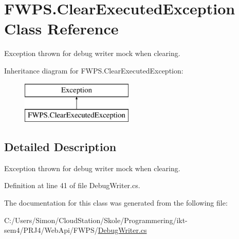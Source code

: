 \hypertarget{class_f_w_p_s_1_1_clear_executed_exception}{}\section{F\+W\+P\+S.\+Clear\+Executed\+Exception Class Reference}
\label{class_f_w_p_s_1_1_clear_executed_exception}


Exception thrown for debug writer mock when clearing.  


Inheritance diagram for F\+W\+P\+S.\+Clear\+Executed\+Exception\+:\begin{figure}[H]
\begin{center}
\leavevmode
\includegraphics[height=2.000000cm]{class_f_w_p_s_1_1_clear_executed_exception}
\end{center}
\end{figure}


\subsection{Detailed Description}
Exception thrown for debug writer mock when clearing. 

Definition at line 41 of file Debug\+Writer.\+cs.



The documentation for this class was generated from the following file\+:\begin{DoxyCompactItemize}
\item 
C\+:/\+Users/\+Simon/\+Cloud\+Station/\+Skole/\+Programmering/ikt-\/sem4/\+P\+R\+J4/\+Web\+Api/\+F\+W\+P\+S/\mbox{\hyperlink{_debug_writer_8cs}{Debug\+Writer.\+cs}}\end{DoxyCompactItemize}
